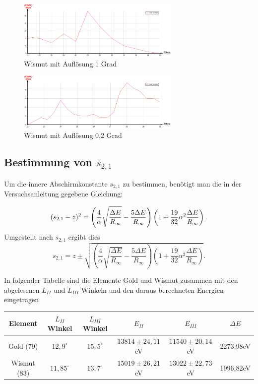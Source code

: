 \begin{figure}[H]
\includegraphics[width=0.7\textwidth] {pics/wismut01.png}
\centering
\caption{Wismut mit Auflösung 1 Grad}
\label{wism1}
\end{figure}

\begin{figure}[H]
\includegraphics[width=0.7\textwidth] {pics/wismut02.png}
\centering
\caption{Wismut mit Auflösung 0,2 Grad}
\label{wism2}
\end{figure}

\subsection{Bestimmung von $s_{2,1}$}
Um die innere Abschirmkonstante $s_{2,1}$ zu bestimmen, benötigt man die in der Versuchsanleitung gegebene Gleichung:

\begin{equation}
(s_{2,1}-z)^2 = \left(\frac{4}{\alpha}\sqrt{\frac{\Delta E}{R_\infty}}-\frac{5 \Delta E}{R_\infty}\right) \left(1+\frac{19}{32} \alpha^2 \frac{\Delta E}{R_\infty}\right)\\.
\end{equation}
Umgestellt nach $s_{2,1}$ ergibt dies
\begin{equation}
s_{2,1} =z\pm\sqrt{\left(\frac{4}{\alpha}\sqrt{\frac{\Delta E}{R_\infty}}-\frac{5 \Delta E}{R_\infty}\right) \left(1+\frac{19}{32} \alpha^2 \frac{\Delta E}{R_\infty}\right)}.
\label{s21}
\end{equation}

In folgender Tabelle sind die Elemente Gold und Wismut zusammen mit den abgelesenen $L_{II}$ und $L_{III}$ Winkeln und den daraus berechneten Energien eingetragen
\begin{table}[H]
\begin{tabular}{|c|c|c|c|c|c|}
\hline 
Element & $L_{II}$ Winkel & $L_{III}$ Winkel & $E_{II}$ & $E_{III}$ & $\Delta E$ \\ 
\hline 
Gold (79) & $12,9^\circ$ & $15,5^\circ$ & $13814\pm24,11$eV & $11540\pm20,14$eV & 2273,98eV \\ 
\hline 
Wismut (83) & $11,85^\circ$ & $13,7^\circ$ & $15019\pm26,21$eV & $13022\pm22,73$eV & 1996,82eV \\ 
\hline
\end{tabular} 
\end{table}

